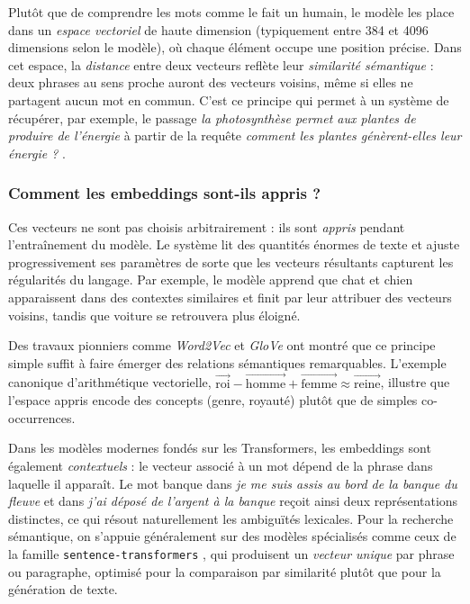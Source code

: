 \documentclass[a4paper,11pt]{article}
\begin{document}
Plutôt que de \og comprendre \fg{} les mots comme le fait un humain, le
modèle les place dans un \emph{espace vectoriel} de haute dimension
(typiquement entre 384 et 4096 dimensions selon le modèle), où chaque
élément occupe une position précise. Dans cet espace, la \emph{distance}
entre deux vecteurs reflète leur \emph{similarité sémantique} : deux
phrases au sens proche auront des vecteurs voisins, même si elles ne
partagent aucun mot en commun. C'est ce principe qui permet à un système
de récupérer, par exemple, le passage \textit{\og la photosynthèse permet
aux plantes de produire de l'énergie \fg{}} à partir de la requête
\textit{\og comment les plantes génèrent-elles leur énergie ? \fg{}}.

\subsubsection{Comment les embeddings sont-ils appris ?}

Ces vecteurs ne sont pas choisis arbitrairement : ils sont \emph{appris}
pendant l'entraînement du modèle. Le système lit des quantités énormes de
texte et ajuste progressivement ses paramètres de sorte que les vecteurs
résultants capturent les régularités du langage. Par exemple, le modèle
apprend que \og chat \fg{} et \og chien \fg{} apparaissent dans des contextes
similaires et finit par leur attribuer des vecteurs voisins, tandis que
\og voiture \fg{} se retrouvera plus éloigné.

Des travaux pionniers comme \emph{Word2Vec} \cite{mikolov2013word2vec} et
\emph{GloVe} \cite{pennington2014glove} ont montré que ce principe simple
suffit à faire émerger des relations sémantiques remarquables. L'exemple
canonique d'arithmétique vectorielle,
$\overrightarrow{\text{roi}} - \overrightarrow{\text{homme}}
+ \overrightarrow{\text{femme}} \approx \overrightarrow{\text{reine}}$,
illustre que l'espace appris encode des concepts (genre, royauté) plutôt
que de simples co-occurrences.

Dans les modèles modernes fondés sur les Transformers, les embeddings sont
également \emph{contextuels} : le vecteur associé à un mot dépend de la
phrase dans laquelle il apparaît. Le mot \og banque \fg{} dans
\textit{\og je me suis assis au bord de la banque du fleuve \fg{}} et dans
\textit{\og j'ai déposé de l'argent à la banque \fg{}} reçoit ainsi deux
représentations distinctes, ce qui résout naturellement les ambiguïtés
lexicales. Pour la recherche sémantique, on s'appuie généralement sur des
modèles spécialisés comme ceux de la famille
\texttt{sentence-transformers} \cite{reimers2019sbert}, qui produisent un
\emph{vecteur unique} par phrase ou paragraphe, optimisé pour la comparaison
par similarité plutôt que pour la génération de texte.
\end{document}
